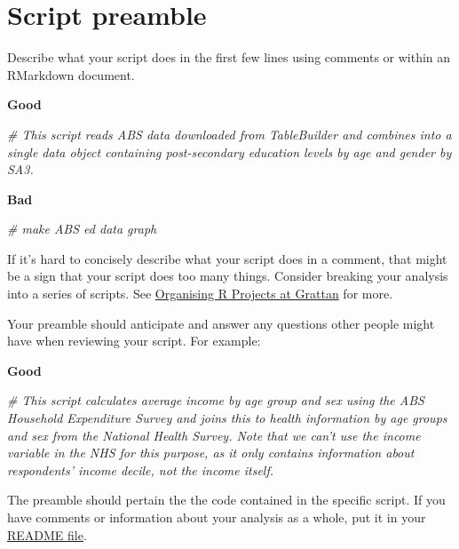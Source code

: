 \documentclass[]{book}
\newenvironment{Shaded}{\begin{snugshade}}{\end{snugshade}}
\newcommand{\CommentTok}[1]{\textcolor[rgb]{0.56,0.35,0.01}{\textit{#1}}}
\begin{document}
\hypertarget{script-preamble}{%
\section{Script preamble}\label{script-preamble}}

Describe what your script does in the first few lines using comments or within an RMarkdown document.

\textbf{Good}

\begin{Shaded}
\begin{Highlighting}[]
\CommentTok{# This script reads ABS data downloaded from TableBuilder and combines into a single data object containing post-secondary education levels by age and gender by SA3. }
\end{Highlighting}
\end{Shaded}

\textbf{Bad}

\begin{Shaded}
\begin{Highlighting}[]
\CommentTok{# make ABS ed data graph}
\end{Highlighting}
\end{Shaded}

If it's hard to concisely describe what your script does in a comment, that might be a sign that your script does too many things. Consider breaking your analysis into a series of scripts. See \protect\hyperlink{organising-projects}{Organising R Projects at Grattan} for more.

Your preamble should anticipate and answer any questions other people might have when reviewing your script. For example:

\textbf{Good}

\begin{Shaded}
\begin{Highlighting}[]
\CommentTok{# This script calculates average income by age group and sex using the ABS Household Expenditure Survey and joins this to health information by age groups and sex from the National Health Survey. Note that we can't use the income variable in the NHS for this purpose, as it only contains information about respondents' income decile, not the income itself.}
\end{Highlighting}
\end{Shaded}

The preamble should pertain the the code contained in the specific script. If you have comments or information about your analysis as a whole, put it in your \protect\hyperlink{README}{README file}.
\end{document}
